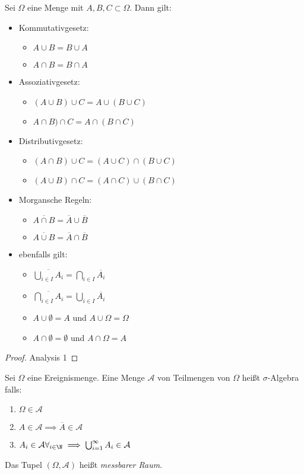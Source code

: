\begin{theorem}
	Sei $\Omega$ eine Menge mit $A,B,C \subset \Omega$. Dann gilt: 
	\begin{itemize}
		\item Kommutativgesetz:
		\begin{itemize}
			\item $A \cup B = B \cup A$
			\item $A \cap B= B \cap A$ 
		\end{itemize}
	\item Assoziativgesetz:
		\begin{itemize}
		\item $(A \cup B) \cup C = A \cup (B \cup C)$
		\item $A \cap B) \cap C = A \cap (B \cap C)$
		\end{itemize}
	\item Distributivgesetz:
		\begin{itemize}
			\item $(A \cap B) \cup C = (A \cup C) \cap (B \cup C)$
			\item $(A \cup B) \cap C = (A \cap C) \cup (B \cap C)$ 
		\end{itemize}
	\item Morgansche Regeln:
		\begin{itemize}
			\item $\overline{A \cap B}= \overline{A}\cup \overline{B}$
			\item $\overline{A \cup B}= \overline{A}\cap \overline{B}$ 
		\end{itemize}
		
	\item ebenfalls gilt:
		\begin{itemize}
		\item $\overline{\bigcup_{i \in I}A_i}= \bigcap_{i \in I} \overline{A_i}$
		\item $\overline{\bigcap_{i \in I}A_i} = \bigcup_{i \in I} \overline{A_i}$
		\item $A \cup \emptyset = A$ und $A \cup \Omega = \Omega$
		\item $A \cap \emptyset = \emptyset$ und $A \cap \Omega = A$  
		\end{itemize}
	\end{itemize}
\end{theorem}
\begin{proof}
Analysis 1
\end{proof}
\begin{definition}
	Sei $\Omega$ eine Ereignismenge. Eine Menge $\mathcal{A}$ von Teilmengen von $\Omega$ heißt $\sigma$-Algebra falls:
	\begin{enumerate}
		\item $\Omega \in \mathcal{A}$ 
		\item $A \in \mathcal{A} \implies \overline{A}\in \mathcal{A}$
		\item $A_i \in \mathcal{A} \forall_{i \in \N}\implies \bigcup_{i=1}^{\infty} A_i \in \mathcal{A}$
	\end{enumerate}
	Das Tupel $(\Omega, \mathcal{A})$ heißt \emph{messbarer Raum}.
\end{definition}
